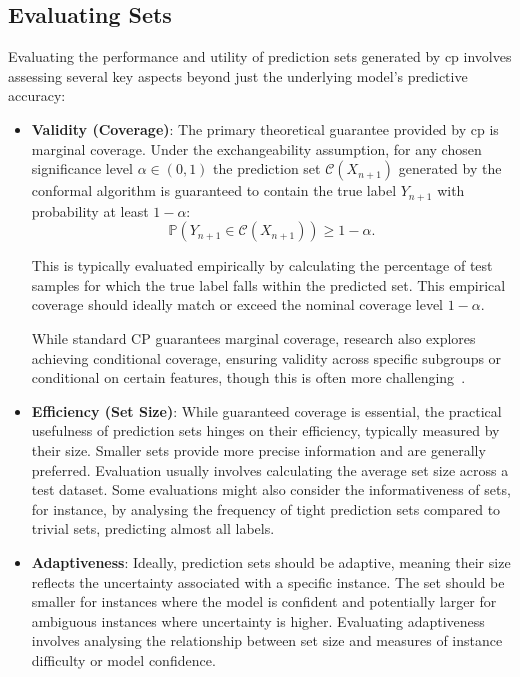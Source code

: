 \subsection{Evaluating Sets}

Evaluating the performance and utility of prediction sets generated by
\gls{cp} involves assessing several key aspects
beyond just the underlying model's predictive accuracy:

\begin{itemize}
    \item \textbf{Validity (Coverage)}:
    The primary theoretical guarantee provided by \gls{cp} is marginal coverage.
    Under the exchangeability assumption,
    for any chosen significance level \(\alpha \in (0, 1)\)
    the prediction set \(\mathcal{C}(X_{n+1})\) generated by the conformal algorithm
    is guaranteed to contain the true label \(Y_{n+1}\)
    with probability at least \(1 - \alpha\):
    \begin{equation}
        \label{eq:coverage}
        \mathbb{P} \left( Y_{n+1} \in \mathcal{C}(X_{n+1}) \right) \geq 1 - \alpha.
    \end{equation}

    This is typically evaluated empirically by
    calculating the percentage of test samples for which
    the true label falls within the predicted set.
    This empirical coverage should ideally match or exceed
    the nominal coverage level \(1 - \alpha\).

    While standard CP guarantees marginal coverage, research also
    explores achieving conditional coverage, ensuring validity across specific
    subgroups or conditional on certain features, though this is often more
    challenging~\cite{angelopoulos2022gentle}.

    \item \textbf{Efficiency (Set Size)}:
    While guaranteed coverage is essential,
    the practical usefulness of prediction sets hinges on their efficiency,
    typically measured by their size.
    Smaller sets provide more precise information and are generally preferred.
    Evaluation usually involves calculating the average set size across a test dataset.
    Some evaluations might also consider the informativeness of sets, for instance,
    by analysing the frequency of tight prediction sets compared
    to trivial sets, predicting almost all labels.

    \item \textbf{Adaptiveness}:
    Ideally, prediction sets should be adaptive,
    meaning their size reflects the uncertainty associated with a specific instance.
    The set should be smaller for instances where the model is confident
    and potentially larger for ambiguous instances where uncertainty is higher.
    Evaluating adaptiveness involves analysing the relationship
    between set size and measures of instance difficulty or model confidence.
\end{itemize}

